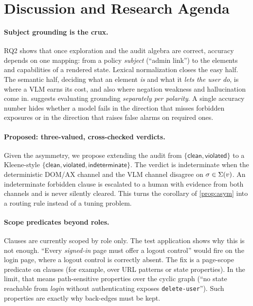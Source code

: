 \section{Discussion and Research Agenda}
\label{sec:discussion}

\paragraph{Subject grounding is the crux.}
RQ2 shows that once exploration and the audit algebra are correct, accuracy
depends on one mapping: from a policy \emph{subject} (``admin link'') to the
elements and capabilities of a rendered state. Lexical normalization closes
the easy half. The semantic half, deciding what an element \emph{is} and what
it \emph{lets the user do}, is where a VLM earns its cost, and also where
negation weakness and hallucination come in.  suggests
evaluating grounding \emph{separately per polarity}. A single accuracy number
hides whether a model fails in the direction that misses forbidden exposures
or in the direction that raises false alarms on required ones.

\paragraph{Proposed: three-valued, cross-checked verdicts.}
Given the asymmetry, we propose extending the audit from $\{\textsf{clean},
\textsf{violated}\}$ to a Kleene-style $\{\textsf{clean}, \textsf{violated},
\textsf{indeterminate}\}$. The verdict is \textsf{indeterminate} when the
deterministic DOM/AX channel and the VLM channel disagree on $\sigma\in\Sigma(v)$.
An indeterminate forbidden clause is escalated to a human with evidence from
both channels and is never silently cleared. This turns the corollary of
\cref{prop:asym} into a routing rule instead of a tuning problem.

\paragraph{Scope predicates beyond roles.}
Clauses are currently scoped by role only. The test application shows why this
is not enough. ``Every \emph{signed-in} page must offer a logout control'' would
fire on the login page, where a logout control is correctly absent. The fix is
a page-scope predicate on clauses (for example, over URL patterns or state
properties). In the limit, that means path-sensitive properties over the
cyclic graph (``no state reachable from \emph{login} without authenticating
exposes \texttt{delete-user}''). Such properties are exactly why back-edges
must be kept.

